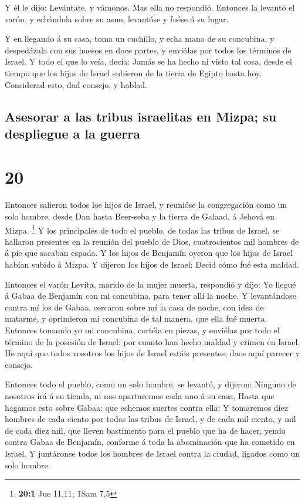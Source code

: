  Y él le dijo: Levántate, y vámonos. Mas ella no respondió.
Entonces la levantó el varón, y echándola sobre su asno, levantóse y
fuése á su lugar.

 Y en llegando á su casa, toma un cuchillo, y echa mano de
su concubina, y despedázala con sus huesos en doce partes, y enviólas
por todos los términos de Israel.  Y todo el que lo veía,
decía: Jamás se ha hecho ni visto tal cosa, desde el tiempo que los
hijos de Israel subieron de la tierra de Egipto hasta hoy. Considerad
esto, dad consejo, y hablad.

\hypertarget{asesorar-a-las-tribus-israelitas-en-mizpa-su-despliegue-a-la-guerra}{%
\subsection{Asesorar a las tribus israelitas en Mizpa; su despliegue a
la
guerra}\label{asesorar-a-las-tribus-israelitas-en-mizpa-su-despliegue-a-la-guerra}}

\hypertarget{section-19}{%
\section{20}\label{section-19}}

 Entonces salieron todos los hijos de Israel, y reunióse la
congregación como un solo hombre, desde Dan hasta Beer-seba y la tierra
de Galaad, á Jehová en Mizpa. \footnote{\textbf{20:1} Jue 11,11; 1Sam
  7,5}  Y los principales de todo el pueblo, de todas las
tribus de Israel, se hallaron presentes en la reunión del pueblo de
Dios, cuatrocientos mil hombres de á pie que sacaban espada.
 Y los hijos de Benjamín oyeron que los hijos de Israel
habían subido á Mizpa. Y dijeron los hijos de Israel: Decid cómo fué
esta maldad.

 Entonces el varón Levita, marido de la mujer muerta,
respondió y dijo: Yo llegué á Gabaa de Benjamín con mi concubina, para
tener allí la noche.  Y levantándose contra mí los de Gabaa,
cercaron sobre mí la casa de noche, con idea de matarme, y oprimieron mi
concubina de tal manera, que ella fué muerta.  Entonces
tomando yo mi concubina, cortéla en piezas, y enviélas por todo el
término de la posesión de Israel: por cuanto han hecho maldad y crimen
en Israel.  He aquí que todos vosotros los hijos de Israel
estáis presentes; daos aquí parecer y consejo.

 Entonces todo el pueblo, como un solo hombre, se levantó, y
dijeron: Ninguno de nosotros irá á su tienda, ni nos apartaremos cada
uno á su casa,  Hasta que hagamos esto sobre Gabaa: que
echemos suertes contra ella;  Y tomaremos diez hombres de
cada ciento por todas las tribus de Israel, y de cada mil ciento, y mil
de cada diez mil, que lleven bastimento para el pueblo que ha de hacer,
yendo contra Gabaa de Benjamín, conforme á toda la abominación que ha
cometido en Israel.  Y juntáronse todos los hombres de
Israel contra la ciudad, ligados como un solo hombre.

